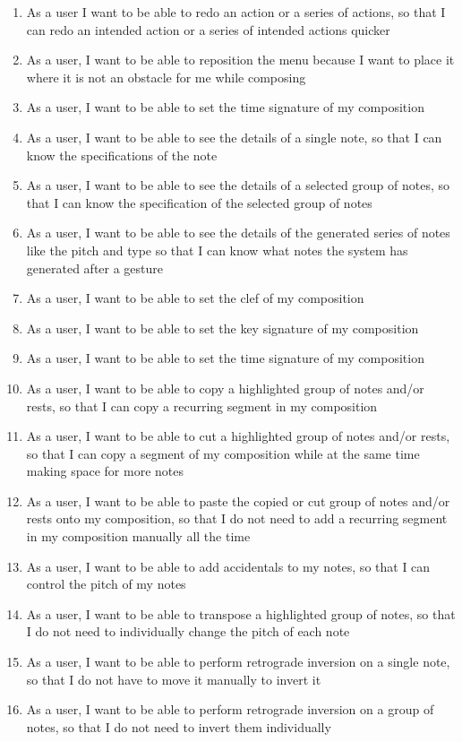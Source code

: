 \begin{enumerate}
\item As a user I want to be able to redo an action or a series of actions, so that I can redo an intended action or a series of intended actions quicker
\item As a user, I want to be able to reposition the menu because I want to place it where it is not an obstacle for me while composing
\item As a user, I want to be able to set the time signature of my composition
\item As a user, I want to be able to see the details of a single note, so that I can know the specifications of the note
\item As a user, I want to be able to see the details of a selected group of notes, so that I can know the specification of the selected group of notes
\item As a user, I want to be able to see the details of the generated series of notes like the pitch and type so that I can know what notes the system has generated after a gesture
\item As a user, I want to be able to set the clef of my composition
\item As a user, I want to be able to set the key signature of my composition
\item As a user, I want to be able to set the time signature of my composition
\item As a user, I want to be able to copy a highlighted group of notes and/or rests, so that I can copy a recurring segment in my composition
\item As a user, I want to be able to cut a highlighted group of notes and/or rests, so that I can copy a segment of my composition while at the same time making space for more notes
\item As a user, I want to be able to paste the copied or cut group of notes and/or rests onto my composition, so that I do not need to add a recurring segment in my composition manually all the time
\item As a user, I want to be able to add accidentals to my notes, so that I can control the pitch of my notes
\item As a user, I want to be able to transpose a highlighted group of notes, so that I do not need to individually change the pitch of each note
\item As a user, I want to be able to perform retrograde inversion on a single note, so that I do not have to move it manually to invert it
\item As a user, I want to be able to perform retrograde inversion on a group of notes, so that I do not need to invert them individually

\end{enumerate}


